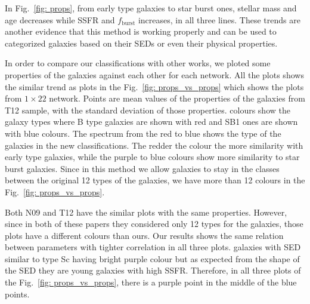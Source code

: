         In Fig.~\ref{fig: props}, from early type galaxies to star burst ones, stellar mass and age decreases while SSFR and $f_\mathrm{burst}$ increases, in all three lines. 
        These trends are another evidence that this method is working properly and can be used to categorized galaxies based on their SEDs or even their physical properties.
        
        In order to compare our classifications with other works, we ploted some properties of the galaxies against each other for each network.%
        All the plots shows the similar trend as plots in the Fig.~\ref{fig: props_vs_props} which shows the plots from $1\times22$ network. 
        Points are mean values of the properties of the galaxies from T12 sample, with the standard deviation of those properties.
        colours show the galaxy types where B type galaxies are shown with red and SB1 ones are shown with blue colours.
        The spectrum from the red to blue shows the type of the galaxies in the new classifications. 
        The redder the colour the more similarity with early type galaxies, while the purple to blue colours show more similarity to star burst galaxies.
        Since in this method we allow galaxies to stay in the classes between the original 12 types of the galaxies, we have more than 12 colours in the Fig.~\ref{fig: props_vs_props}.
        
        Both N09 and T12 have the similar plots with the same properties.
        However, since in both of these papers they considered only 12 types for the galaxies, those plots have a different colours than ours.
        Our results shows the same relation between parameters with tighter correlation in all three plots.
        galaxies with SED similar to type Sc having bright purple colour but as expected from the shape of the SED they are young galaxies with high SSFR.
        Therefore, in all three plots of the Fig.~\ref{fig: props_vs_props}, there is a purple point in the middle of the blue points.
        
        

    
    
